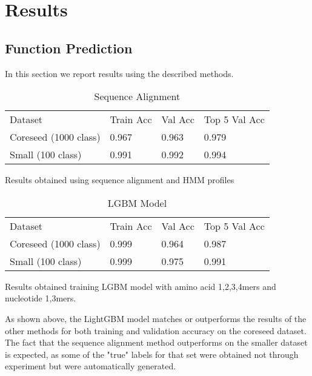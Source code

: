 \section{Results}
\subsection{Function Prediction}
In this section we report results using the described methods.
\begin{table}[htb]
\centering
\caption{Sequence Alignment}
\bigbreak
\label{my-label}
\begin{tabular}{llll}
Dataset		&	Train Acc             & Val Acc & Top 5 Val Acc       \\
Coreseed (1000 class) & 0.967   & 0.963         & 0.979 \\
Small (100 class)     & 0.991   & 0.992         & 0.994
\end{tabular}
\bigbreak
\footnotesize Results obtained using sequence alignment and HMM profiles
\end{table}

\begin{table}[htb]
\caption{LGBM Model}
\bigbreak
\centering
\label{my-label}
\begin{tabular}{llll}
Dataset 	&	Train Acc             & Val Acc & Top 5 Val Acc       \\
Coreseed (1000 class) & 0.999   & 0.964         & 0.987 \\
Small (100 class)     & 0.999   & 0.975         & 0.991
\end{tabular}
\bigbreak
\footnotesize Results obtained training LGBM model with amino acid 1,2,3,4mers and nucleotide 1,3mers.
\end{table}

As shown above, the LightGBM model matches or outperforms the results of the other methods for both training and validation accuracy on the coreseed dataset. The fact that the sequence alignment method outperforms on the smaller dataset is expected, as some of the "true" labels for that set were obtained not through experiment but were automatically generated. 


